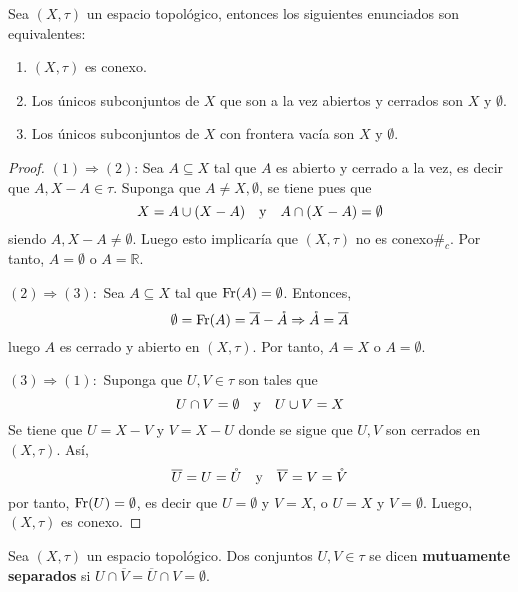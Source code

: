 \documentclass[12pt]{report}
\theoremstyle{largebreak}
\newcommand\contradiction{\ensuremath{\#_c}}
\newcommand{\Int}[1]{\ensuremath{\mathring{#1}}}
\newcommand{\Cls}[1]{\ensuremath{\overline{#1}}}
\newcommand{\Fr}[1]{\ensuremath{\textup{Fr}(#1)}}
\begin{document}
    \begin{propo}
        Sea $(X,\tau)$ un espacio topológico, entonces los siguientes enunciados son equivalentes:
        \begin{enumerate}
            \item $(X,\tau)$ es conexo.
            \item Los únicos subconjuntos de $X$ que son a la vez abiertos y cerrados son $X$ y $\emptyset$.
            \item Los únicos subconjuntos de $X$ con frontera vacía son $X$ y $\emptyset$.
        \end{enumerate}
    \end{propo}

    \begin{proof}
        $(1)\Rightarrow(2)$: Sea $A\subseteq X$ tal que $A$ es abierto y cerrado a la vez, es decir que $A,X-A\in\tau$. Suponga que $A\neq X,\emptyset$, se tiene pues que
        \begin{equation*}
            X=A\cup (X-A)\quad\textup{y}\quad A\cap (X-A)=\emptyset
        \end{equation*}
        siendo $A,X-A\neq\emptyset$. Luego esto implicaría que $(X,\tau)$ no es conexo\contradiction. Por tanto, $A=\emptyset$ o $A=\mathbb{R}$.

        $(2)\Rightarrow(3):$ Sea $A\subseteq X$ tal que $\Fr{A}=\emptyset$. Entonces,
        \begin{equation*}
            \emptyset=\Fr{A}=\Cls{A}-\Int{A}\Rightarrow \Int{A}=\Cls{A}
        \end{equation*}
        luego $A$ es cerrado y abierto en $(X,\tau)$. Por tanto, $A=X$ o $A=\emptyset$.

        $(3)\Rightarrow (1):$ Suponga que $U,V\in\tau$ son tales que
        \begin{equation*}
            U\cap V=\emptyset\quad\textup{y}\quad U\cup V=X
        \end{equation*}
        Se tiene que $U=X-V$ y $V=X-U$ donde se sigue que $U,V$ son cerrados en $(X,\tau)$. Así,
        \begin{equation*}
            \Cls{U}=U=\Int{U}\quad\textup{y}\quad\Cls{V}=V=\Int{V}
        \end{equation*}
        por tanto, $\Fr{U}=\emptyset$, es decir que $U=\emptyset$ y $V=X$, o $U=X$ y $V=\emptyset$. Luego, $(X,\tau)$ es conexo.
    \end{proof}

    \begin{mydef}
        Sea $(X,\tau)$ un espacio topológico. Dos conjuntos $U,V\in\tau$ se dicen \textbf{mutuamente separados} si $U\cap\Cls{V}=\Cls{U}\cap V=\emptyset$.
    \end{mydef}
\end{document}
